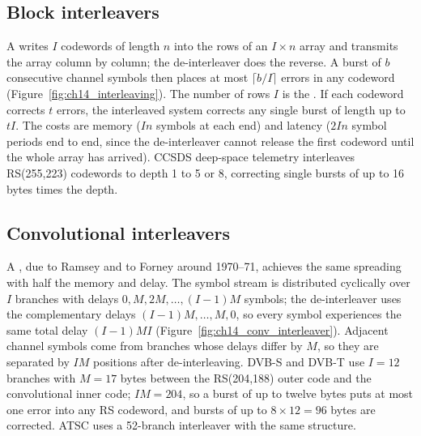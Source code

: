 \subsection{Block interleavers}

A  writes $I$ codewords of length $n$ into the rows of an $I\times n$
array and transmits the array column by column; the de-interleaver does the reverse. A burst of
$b$ consecutive channel symbols then places at most $\lceil b/I\rceil$ errors in any codeword
(Figure~\ref{fig:ch14_interleaving}). The number of rows $I$ is the . If
each codeword corrects $t$ errors, the interleaved system corrects any single burst of length up
to $tI$. The costs are memory ($In$ symbols at each end) and latency ($2In$ symbol periods end
to end, since the de-interleaver cannot release the first codeword until the whole array has
arrived). CCSDS deep-space telemetry interleaves RS(255,223) codewords to depth 1 to 5 or 8,
correcting single bursts of up to 16 bytes times the depth.



\subsection{Convolutional interleavers}

A , due to Ramsey and to Forney around 1970--71, achieves the same
spreading with half the memory and delay. The symbol stream is distributed cyclically over $I$
branches with delays $0,M,2M,\dots,(I-1)M$ symbols; the de-interleaver uses the complementary
delays $(I-1)M,\dots,M,0$, so every symbol experiences the same total delay $(I-1)MI$
(Figure~\ref{fig:ch14_conv_interleaver}). Adjacent channel symbols come from branches whose delays
differ by $M$, so they are separated by $IM$ positions after de-interleaving. DVB-S and DVB-T use
$I=12$ branches with $M=17$ bytes between the RS(204,188) outer code and the convolutional inner
code; $IM=204$, so a burst of up to twelve bytes puts at most one error into any RS codeword, and
bursts of up to $8\times12=96$ bytes are corrected. ATSC uses a 52-branch interleaver with the same
structure.

